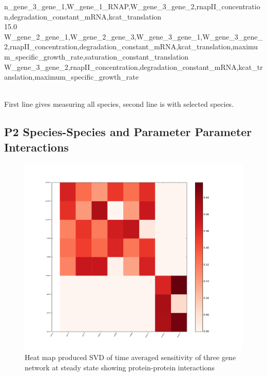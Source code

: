 \documentclass{article}
\begin{document}
\begin{landscape}
{\begin{minipage}{\textwidth}
n\_gene\_3\_gene\_1,W\_gene\_1\_RNAP,W\_gene\_3\_gene\_2,rnapII\_concentration,degradation\_constant\_mRNA,kcat\_translation\\
15.0\\
W\_gene\_2\_gene\_1,W\_gene\_2\_gene\_3,W\_gene\_3\_gene\_1,W\_gene\_3\_gene\_2,rnapII\_concentration,degradation\_constant\_mRNA,kcat\_translation,maximum\_specific\_growth\_rate,saturation\_constant\_translation\\ 
W\_gene\_3\_gene\_2,rnapII\_concentration,degradation\_constant\_mRNA,kcat\_translation,maximum\_specific\_growth\_rate\\ 



\end{minipage}
}\\
First line gives measuring all species, second line is with selected species.
\end{landscape}
\newpage
\subsection*{P2 Species-Species and Parameter Parameter
 Interactions}
 \begin{figure}[!htb]
\includegraphics[width=12cm]{../ThreeGeneRachelV2/figures/ProteinInteractionsFrom0to10}
\caption{Heat map produced SVD of time averaged sensitivity of three gene network at steady state showing protein-protein interactions}
\end{figure}
\end{document}
